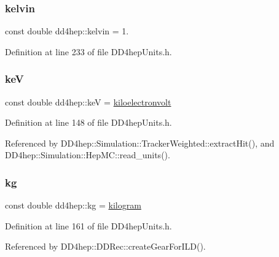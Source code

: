 \subsubsection{\texorpdfstring{kelvin}{kelvin}}
{\footnotesize\ttfamily const double dd4hep\+::kelvin = 1.\hspace{0.3cm}{\ttfamily [static]}}



Definition at line 233 of file D\+D4hep\+Units.\+h.

\hypertarget{namespacedd4hep_a2b928c9b9d50fa8a9d3f9840f3a5f258}{}\label{namespacedd4hep_a2b928c9b9d50fa8a9d3f9840f3a5f258} 
\subsubsection{\texorpdfstring{keV}{keV}}
{\footnotesize\ttfamily const double dd4hep\+::keV = \hyperlink{namespacedd4hep_a05014d49c7c5438820adf620633249e7}{kiloelectronvolt}\hspace{0.3cm}{\ttfamily [static]}}



Definition at line 148 of file D\+D4hep\+Units.\+h.



Referenced by D\+D4hep\+::\+Simulation\+::\+Tracker\+Weighted\+::extract\+Hit(), and D\+D4hep\+::\+Simulation\+::\+Hep\+M\+C\+::read\+\_\+units().

\hypertarget{namespacedd4hep_a14dce8e79bc3ccbc37eaa636bf0f2329}{}\label{namespacedd4hep_a14dce8e79bc3ccbc37eaa636bf0f2329} 
\subsubsection{\texorpdfstring{kg}{kg}}
{\footnotesize\ttfamily const double dd4hep\+::kg = \hyperlink{namespacedd4hep_a94c5d58440a5bf3d43b1edaa51ae5294}{kilogram}\hspace{0.3cm}{\ttfamily [static]}}



Definition at line 161 of file D\+D4hep\+Units.\+h.



Referenced by D\+D4hep\+::\+D\+D\+Rec\+::create\+Gear\+For\+I\+L\+D().

\hypertarget{namespacedd4hep_ad7b0ac954bae8a93a0162f9f08fd9766}{}\label{namespacedd4hep_ad7b0ac954bae8a93a0162f9f08fd9766} 
